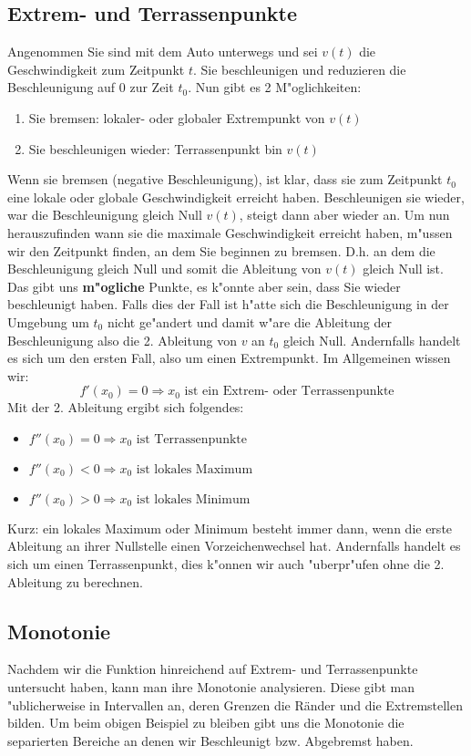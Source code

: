 \subsection{Extrem- und Terrassenpunkte}
Angenommen Sie sind mit dem Auto unterwegs und sei $v(t)$ die Geschwindigkeit zum Zeitpunkt $t$. Sie beschleunigen und reduzieren die Beschleunigung auf $0$ zur Zeit $t_0$. Nun gibt es 2 M"oglichkeiten:
\begin{enumerate}
\item Sie bremsen: lokaler- oder globaler Extrempunkt von $v(t)$
\item Sie beschleunigen wieder: Terrassenpunkt bin $v(t)$
\end{enumerate}
Wenn sie bremsen (negative Beschleunigung), ist klar, dass sie zum Zeitpunkt $t_0$ eine lokale oder globale Geschwindigkeit erreicht haben. Beschleunigen sie wieder, war die Beschleunigung gleich Null $v(t)$, steigt dann aber wieder an. Um nun herauszufinden wann sie die maximale Geschwindigkeit erreicht haben, m"ussen wir den Zeitpunkt finden, an dem Sie beginnen zu bremsen. D.h. an dem die Beschleunigung gleich Null und somit die Ableitung von $v(t)$ gleich Null ist. Das gibt uns \textbf{m"ogliche} Punkte, es k"onnte aber sein, dass Sie wieder beschleunigt haben. Falls dies der Fall ist h"atte sich die Beschleunigung in der Umgebung um $t_0$ nicht ge"andert und damit w"are die Ableitung der Beschleunigung also die 2. Ableitung von $v$ an $t_0$ gleich Null. Andernfalls handelt es sich um den ersten Fall, also um einen Extrempunkt. Im Allgemeinen wissen wir:
\begin{equation*}
f'(x_0) = 0 \Rightarrow x_0 \text{ ist ein Extrem- oder Terrassenpunkte}
\end{equation*}
Mit der 2. Ableitung ergibt sich folgendes:
\begin{itemize}
\item $f''(x_0) = 0 \Rightarrow x_0 \text{ ist Terrassenpunkte}$ 
\item $f''(x_0) < 0 \Rightarrow x_0 \text{ ist lokales Maximum }$
\item $f''(x_0) > 0 \Rightarrow x_0 \text{ ist lokales Minimum}$
\end{itemize}
Kurz: ein lokales Maximum oder Minimum besteht immer dann, wenn die erste Ableitung an ihrer Nullstelle einen Vorzeichenwechsel hat. Andernfalls handelt es sich um einen Terrassenpunkt, dies k"onnen wir auch "uberpr"ufen ohne die 2. Ableitung zu berechnen.

 \subsection{Monotonie}
Nachdem wir die Funktion hinreichend auf Extrem- und Terrassenpunkte untersucht haben, kann man ihre Monotonie analysieren. Diese gibt man "ublicherweise in Intervallen an, deren Grenzen die Ränder und die Extremstellen bilden. Um beim obigen Beispiel zu bleiben gibt uns die Monotonie die separierten Bereiche an denen wir Beschleunigt bzw. Abgebremst haben.

